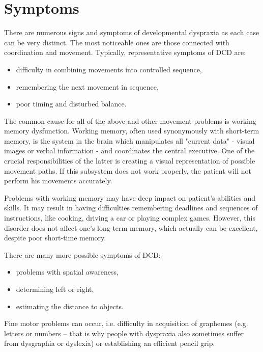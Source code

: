 \section{Symptoms}
There are numerous signs and symptoms of developmental dyspraxia as each case can be very distinct. The most noticeable ones are those connected with coordination and movement. Typically, representative symptoms of DCD are:

\begin{itemize} [noitemsep]
\item difficulty in combining movements into controlled sequence,
\item remembering the next movement in sequence,
\item poor timing and disturbed balance.
\end{itemize}

The common cause for all of the above and other movement problems is working memory dysfunction.
Working memory, often used synonymously with short-term memory, is the system in the brain which manipulates all "current data" - visual images or verbal information - and coordinates the central executive. 
One of the crucial responsibilities of the latter is creating a visual representation of possible movement paths. 
If this subsystem does not work properly, the patient will not perform his movements accurately. 

Problems with working memory may have deep impact on patient's abilities and skills. It may result in having difficulties remembering deadlines and sequences of instructions, like cooking, driving a car or playing complex games. However, this disorder does not affect one's long-term memory, which actually can be excellent, despite poor short-time memory.

There are many more possible symptoms of DCD:

\begin{itemize} [noitemsep]
\item problems with spatial awareness, 
\item determining left or right, 
\item estimating the distance to objects.
\end{itemize} 

Fine motor problems can occur, i.e. difficulty in acquisition of graphemes (e.g. letters or numbers – that is why people with dyspraxia also sometimes suffer from dysgraphia or dyslexia) or establishing an efficient pencil grip.


